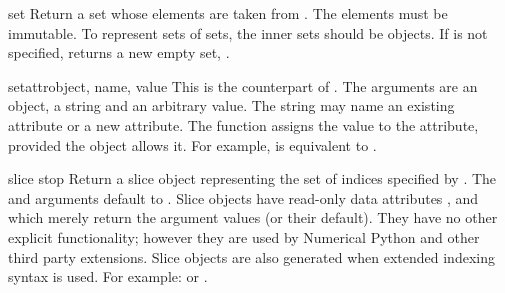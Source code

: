 \begin{funcdesc}{set}{}
  Return a set whose elements are taken from .  The elements
  must be immutable.  To represent sets of sets, the inner sets should
  be  objects.  If  is not specified,
  returns a new empty set, .
\end{funcdesc}

\begin{funcdesc}{setattr}{object, name, value}
  This is the counterpart of .  The arguments are an
  object, a string and an arbitrary value.  The string may name an
  existing attribute or a new attribute.  The function assigns the
  value to the attribute, provided the object allows it.  For example,
   is equivalent to
  .
\end{funcdesc}

\begin{funcdesc}{slice}{ stop}
  Return a slice object representing the set of indices specified by
  .  The 
  and  arguments default to .  Slice objects have
  read-only data attributes ,  and
   which merely return the argument values (or their
  default).  They have no other explicit functionality; however they
  are used by Numerical Python and other third
  party extensions.  Slice objects are also generated when extended
  indexing syntax is used.  For example:  or
  .
\end{funcdesc}

